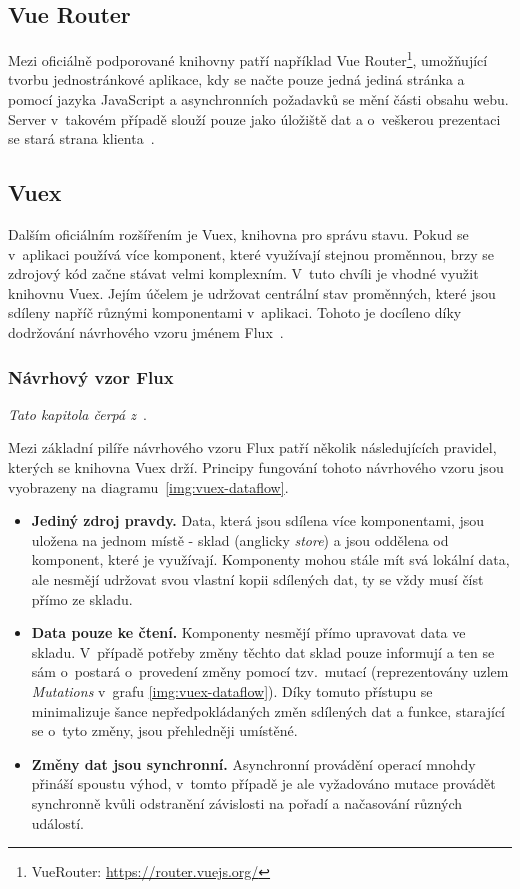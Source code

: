 \subsection{Vue Router}
Mezi oficiálně podporované knihovny patří například Vue Router\footnote{VueRouter: \url{https://router.vuejs.org/}}, umožňující tvorbu jednostránkové aplikace, kdy se načte pouze jedná jediná stránka a pomocí jazyka JavaScript a asynchronních požadavků se mění části obsahu webu. Server v~takovém případě slouží pouze jako úložiště dat a o~veškerou prezentaci se stará strana klienta~\cite{bib:vue-router}. %


\subsection{Vuex}
Dalším oficiálním rozšířením je Vuex, knihovna pro správu stavu. Pokud se v~aplikaci používá více komponent, které využívají stejnou proměnnou, brzy se zdrojový kód začne stávat velmi komplexním. 
V~tuto chvíli je vhodné využit knihovnu Vuex. Jejím účelem je udržovat centrální stav proměnných, které jsou sdíleny napříč různými komponentami v~aplikaci. Tohoto je docíleno díky dodržování návrhového vzoru jménem Flux~\cite{bib:vuex-doc}. 


\subsubsection*{Návrhový vzor Flux}
\emph{Tato kapitola čerpá z~\cite{bib:vuex-guide}}.

Mezi základní pilíře návrhového vzoru Flux patří několik následujících pravidel, kterých se knihovna Vuex drží. Principy fungování tohoto návrhového vzoru jsou vyobrazeny na diagramu~\ref{img:vuex-dataflow}.

\begin{itemize}
    \item \textbf{Jediný zdroj pravdy.} Data, která jsou sdílena více komponentami, jsou uložena na jednom místě - sklad (anglicky \emph{store}) a jsou oddělena od komponent, které je využívají. Komponenty mohou stále mít svá lokální data, ale nesmějí udržovat svou vlastní kopii sdílených dat, ty se vždy musí číst přímo ze skladu.
    \item \textbf{Data pouze ke čtení.} Komponenty nesmějí přímo upravovat data ve skladu. V~případě potřeby změny těchto dat sklad pouze informují a ten se sám o~postará o~provedení změny pomocí tzv.~mutací (reprezentovány uzlem \emph{Mutations} v~grafu \ref{img:vuex-dataflow}). Díky tomuto přístupu se minimalizuje šance nepředpokládaných změn sdílených dat a funkce, starající se o~tyto změny, jsou přehledněji umístěné.
    \item \textbf{Změny dat jsou synchronní.} Asynchronní provádění operací mnohdy přináší spoustu výhod, v~tomto případě je ale vyžadováno mutace provádět synchronně kvůli odstranění závislosti na pořadí a načasování různých událostí.
\end{itemize}

